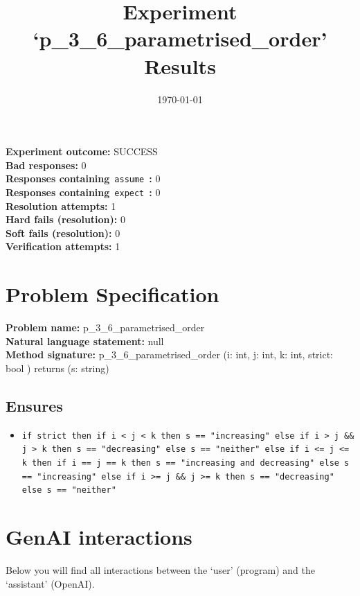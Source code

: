 \documentclass{article}
\begin{document}
\title{Experiment `p\_3\_6\_parametrised\_order' Results}
\author{\today}
\date{}
\maketitle
\textbf{Experiment outcome: }SUCCESS
\\\textbf{Bad responses: }0
\\\textbf{Responses containing}~\texttt{assume}~\textbf{: }0
\\\textbf{Responses containing}~\texttt{expect}~\textbf{: }0
\\\textbf{Resolution attempts: }1
\\\textbf{Hard fails (resolution): }0
\\\textbf{Soft fails (resolution): }0
\\\textbf{Verification attempts: }1
\section*{Problem Specification}
\textbf{Problem name: }p\_3\_6\_parametrised\_order
\\\textbf{Natural language statement: }null
\\\textbf{Method signature: }p\_3\_6\_parametrised\_order (i: int, j: int, k: int, strict: bool ) returns (s: string)
\subsection*{Ensures}
\begin{itemize}
\item \texttt{if strict then if i < j < k then s == "increasing" else if i > j \&\& j > k then s == "decreasing" else s == "neither" else if i <= j <= k then if i == j == k then s == "increasing and decreasing" else s == "increasing" else if i >= j \&\& j >= k then s == "decreasing" else s == "neither"}
\end{itemize}
\clearpage
\section*{GenAI interactions}
Below you will find all interactions between the `user' (program) and the `assistant' (OpenAI).
\end{document}
